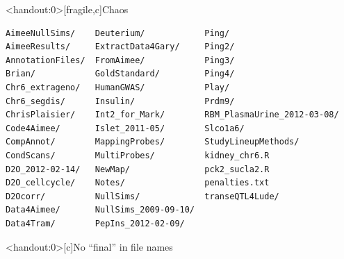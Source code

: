 \documentclass[aspectratio=169,12pt,t]{beamer}
\begin{document}
\begin{frame}<handout:0>[fragile,c]{Chaos}

\addtocounter{framenumber}{-1}

\begin{center}
\begin{minipage}[c]{11.33cm}
\begin{semiverbatim}
\lstset{basicstyle=\scriptsize}
\begin{lstlisting}[linewidth=11.33cm]
AimeeNullSims/    Deuterium/            Ping/
AimeeResults/     ExtractData4Gary/     Ping2/
AnnotationFiles/  FromAimee/            Ping3/
Brian/            GoldStandard/         Ping4/
Chr6_extrageno/   HumanGWAS/            Play/
Chr6_segdis/      Insulin/              Prdm9/
ChrisPlaisier/    Int2_for_Mark/        RBM_PlasmaUrine_2012-03-08/
Code4Aimee/       Islet_2011-05/        Slco1a6/
CompAnnot/        MappingProbes/        StudyLineupMethods/
CondScans/        MultiProbes/          kidney_chr6.R
D2O_2012-02-14/   NewMap/               pck2_sucla2.R
D2O_cellcycle/    Notes/                penalties.txt
D2Ocorr/          NullSims/             transeQTL4Lude/
Data4Aimee/       NullSims_2009-09-10/
Data4Tram/        PepIns_2012-02-09/
\end{lstlisting}
\end{semiverbatim}
\end{minipage}
\end{center}

\end{frame}



\begin{frame}<handout:0>[c]{No ``{\hilit final}'' in file names}

\vspace*{3mm}

\centering


\end{frame}
\end{document}
